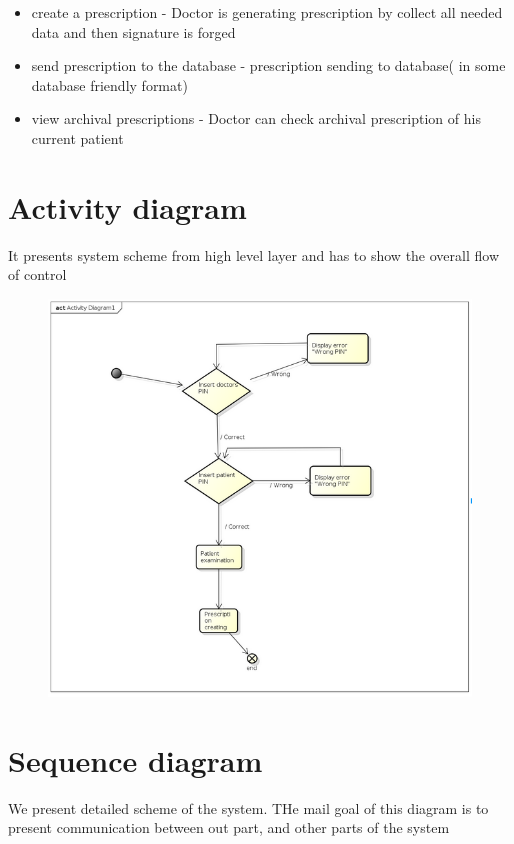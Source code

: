 \begin{itemize}


\item create a prescription - Doctor is generating prescription by collect all needed data and then signature is forged
\item send prescription to the database - prescription sending to database( in some database friendly format)
\item view archival prescriptions - Doctor can check archival prescription of his current patient
\end{itemize}

\section{Activity diagram}
It presents system scheme from high level layer and has to show the overall flow of control
\begin{figure}[h]
\centering
\includegraphics[width=1\textwidth]{doctor/ActivityDiagram.png}
\end{figure} 
\section{Sequence diagram}
We present detailed scheme of the system. THe mail goal of this diagram is to present communication between out part, and other parts of the system

